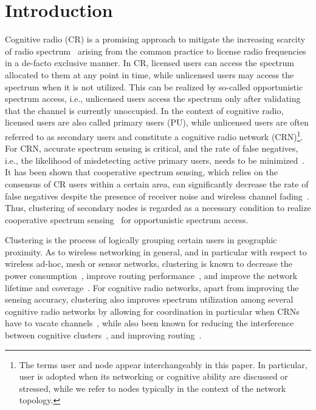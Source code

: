 \documentclass[times]{ettauth}
\newcommand{\ie}{i.e., }
\theoremstyle{mytheoremstyle}
\theoremstyle{mytheoremstyle}
\theoremstyle{mytheoremstyle}
\begin{document}

\maketitle
\graphicspath{
{../figures/04_clutering/}
}

\section{Introduction}
\label{intro}
Cognitive radio (CR) is a promising approach to mitigate the increasing scarcity of radio spectrum~\cite{Mitola} arising from the common practice to license radio frequencies in a de-facto exclusive manner.
In CR, licensed users can access the spectrum allocated to them at any point in time, while unlicensed users may access the spectrum when it is not utilized. 
This can be realized by so-called opportunistic spectrum access, \ie unlicensed users access the spectrum only after validating that the channel is currently unoccupied.
In the context of cognitive radio, licensed users are also called primary users (PU), while unlicensed users are often referred to as secondary users and constitute a cognitive radio network (CRN)\footnote{The terms user and node appear interchangeably in this paper. In particular, user is adopted when its networking or cognitive ability are discussed or stressed, while we refer to nodes typically in the context of the network topology.}.
For CRN, accurate spectrum sensing is critical, and the rate of false negatives, \ie the likelihood of misdetecting active primary users, needs to be minimized~\cite{Sahai_FundamentalDesignTradeoffs2006}.
It has been shown that cooperative spectrum sensing, which relies on the consensus of CR users within a certain area, can significantly decrease the rate of false negatives despite the presence of receiver noise and wireless channel fading~\cite{Jacob2012, coorperativeSensing_Akyildiz11}.
Thus, clustering of secondary nodes is regarded as a necessary condition to realize cooperative spectrum sensing~\cite{Sun07_clustering_spectrum_secsing} for opportunistic spectrum access.

Clustering is the process of logically grouping certain users in geographic proximity.
As to wireless networking in general, and in particular with respect to wireless ad-hoc, mesh or sensor networks, clustering is known to decrease the power consumption~\cite{Kawadia03},  improve routing performance~\cite{clustering_mesh_globecom2010}, and improve the network lifetime and coverage~\cite{Abbasi_survey_07}.
For cognitive radio networks, apart from improving the sensing accuracy, clustering also improves spectrum utilization among several cognitive radio networks by allowing for coordination in particular when CRNs have to vacate channels~\cite{willkomm08}, while also been known for reducing the interference between cognitive clusters~\cite{centralizedSharing80222}, and improving routing~\cite{Abbasi_survey_07}.
\end{document}
